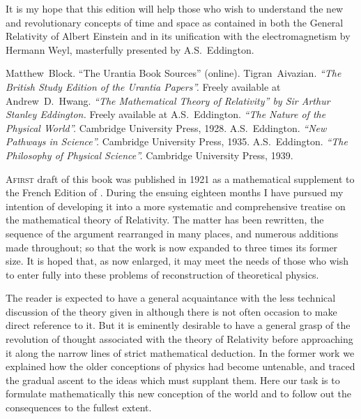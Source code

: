 \documentclass[12pt]{book}
\begin{document}
It is my hope that this edition will help those who wish to understand the new and revolutionary concepts of
time and space as contained in both the General Relativity of Albert Einstein and in its unification with the
electromagnetism by Hermann Weyl, masterfully presented by A.S.~Eddington.


\begin{thebibliography}{100}
Matthew~Block.
{``The Urantia Book Sources'' (online).}
{}
Tigran~Aivazian.
{\em ``The British Study Edition of the Urantia Papers''.}
{Freely available at }
Andrew~D.~Hwang.
{\em ``The Mathematical Theory of Relativity'' by Sir Arthur Stanley Eddington.}
{Freely available at }
A.S.~Eddington.
{\em ``The Nature of the Physical World''.}
{Cambridge University Press,} 1928.
A.S.~Eddington.
{\em ``New Pathways in Science''.}
{Cambridge University Press,} 1935.
A.S.~Eddington.
{\em ``The Philosophy of Physical Science''.}
{Cambridge University Press,} 1939.
\end{thebibliography}


\lettrine{\textcolor{lettrinecolour}{A}}{first} draft of this book was published in 1921 as a mathematical supplement
to the French Edition of . During
the ensuing eighteen months I have pursued my intention of developing it
into a more systematic and comprehensive treatise on the mathematical
theory of Relativity. The matter has been rewritten, the sequence of the argument
rearranged in many places, and numerous additions made throughout;
so that the work is now expanded to three times its former size. It is hoped
that, as now enlarged, it may meet the needs of those who wish to enter fully
into these problems of reconstruction of theoretical physics.

The reader is expected to have a general acquaintance with the less
technical discussion of the theory given in 
although there is not often occasion to make direct reference to it. But it is
eminently desirable to have a general grasp of the revolution of thought
associated with the theory of Relativity before approaching it along the
narrow lines of strict mathematical deduction. In the former work we explained
how the older conceptions of physics had become untenable, and traced
the gradual ascent to the ideas which must supplant them. Here our task is
to formulate mathematically this new conception of the world and to follow
out the consequences to the fullest extent.
\end{document}
